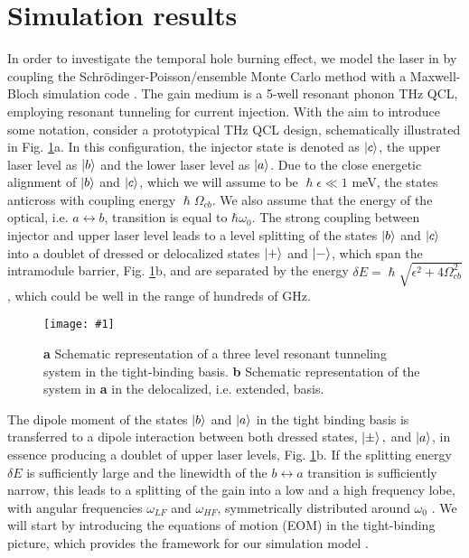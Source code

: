\documentclass[]{spie}  %
\newcommand{\includegraphicsXL}[1]{\texttt{[image: \#1]}}
\begin{document}
\section{Simulation results}
In order to investigate the temporal hole burning effect, we model the laser in  by coupling the Schr\"odinger-Poisson/ensemble Monte Carlo method with a Maxwell-Bloch simulation code \cite{petz2016}. The gain medium is a 5-well resonant phonon THz QCL, employing resonant tunneling for current injection. With the aim to introduce some notation, consider a prototypical THz QCL design, schematically illustrated in Fig. \ref{fig:basis_compare}a. In this configuration, the injector state is denoted as $\ket{c}$, the upper laser level as $\ket{b}$ and the lower laser level as $\ket{a}$. Due to the close energetic alignment of $\ket{b}$ and $\ket{c}$, which we will assume to be $\hslash\epsilon \ll 1$ meV, the states anticross with coupling energy $\hslash\Omega_{cb}$. We also assume that the energy of the optical, i.e. $a\leftrightarrow b$, transition is equal to $\hbar \omega_0$. The strong coupling between injector and upper laser level leads to a level splitting of the states $\ket{b}$ and $\ket{c}$ into a doublet of dressed or delocalized states $\ket{+}$ and $\ket{-}$, which span the intramodule barrier, Fig. \ref{fig:basis_compare}b, and are separated by the energy $\delta E = \hslash\sqrt{\epsilon^2 + 4\Omega_{cb}^2}$, which could be well in the range of hundreds of GHz.  

\begin{figure}[h!]
	\begin{center}
		\includegraphicsXL{IMGS/basis_compare.eps}
		\caption{ \textbf{a} Schematic representation of a three level resonant tunneling system in the tight-binding basis. \textbf{b} Schematic representation of the system in \textbf{a} in the delocalized, i.e. extended, basis.} \label{fig:basis_compare}
	\end{center}	
\end{figure}

The dipole moment of the states $\ket{b}$ and $\ket{a}$ in the tight binding basis is transferred to a dipole interaction between both dressed states, $\ket{\pm},$ and $\ket{a}$, in essence producing a doublet of upper laser levels, Fig. \ref{fig:basis_compare}b. If the splitting energy $\delta E$ is sufficiently large and the linewidth of the $b\leftrightarrow a$ transition is sufficiently narrow, this leads to a splitting of the gain into a low and a high frequency lobe, with angular frequencies $\omega_{LF}$ and $\omega_{HF}$, symmetrically distributed around $\omega_0$ \cite{dupont2010simplified}. We will start by introducing the equations of motion (EOM) in the tight-binding picture, which provides the framework for our simulation model \cite{petz2016}.
\end{document}
